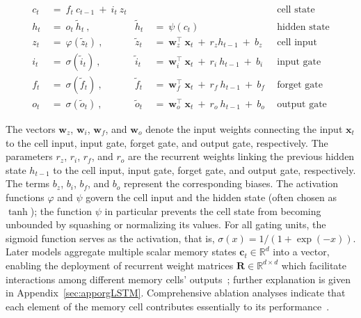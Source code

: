 \begin{align}
c_t \ &= \  f_t \ c_{t-1} \ + \ i_t \ z_t &  & &\text{cell state} \\
h_t  \ &= \ o_t \ \tilde{h}_t \ , & \tilde{h}_t \ &= \ \psi \left( c_t\right)
  &\text{hidden state} \\
z_t \ &= \ \varphi \left( \tilde{z}_t \right) \ , 
  &\tilde{z}_t \ &=  \ \mathbf{w}^\top_{z} \ \mathbf{x}_t \ + \
  r_{z}  h_{t-1} \ + \  b_{z} \ \
  &\text{cell input} \\
i_t \ &= \ \sigma \left( \tilde{i}_t  \right) \ , 
  &\tilde{i}_t \ &= \ \mathbf{w}^\top_{i} \ \mathbf{x}_t \ + \
  r_{i}  \ h_{t-1} \ + \  b_{i} \ \
  &\text{input gate} \\
f_t \ &= \ \sigma \left(  \tilde{f}_t \right) \ , 
  &\tilde{f}_t \ &= \ \mathbf{w}^\top_{f} \ \mathbf{x}_t  \ + \
  r_{f}  \ h_{t-1} \ + \  b_{f} \ \
  &\text{forget gate} \\
o_t \ &= \ \sigma \left( \tilde{o}_t \right) \ , 
  &\tilde{o}_t  \ &= \ \mathbf{w}^\top_{o} \ \mathbf{x}_t \ + \
  r_{o}  \ h_{t-1} \ + \  b_{o} \ \
  &\text{output gate} 
\end{align}

The vectors $\mathbf{w}_{z}$, $\mathbf{w}_{i}$,
$\mathbf{w}_{f}$, and $\mathbf{w}_{o}$ denote the input weights connecting the input $\mathbf{x}_t$ to the cell input, input gate, forget gate, and output gate, respectively. The parameters $r_{z}$, $r_{i}$, $r_{f}$, and $r_{o}$ are the recurrent weights linking the previous hidden state $h_{t-1}$ to the cell input, input gate, forget gate, and output gate, respectively. The terms $b_{z}$, $b_{i}$, $b_{f}$, and $b_{o}$ represent the corresponding biases. The activation functions $\varphi$ and $\psi$ govern the cell input and the hidden state (often chosen as $\tanh$); the function $\psi$ in particular prevents the cell state from becoming unbounded by squashing or normalizing its values. For all gating units, the sigmoid function serves as the activation, that is, $\sigma \left( x \right)= 1/(1+\exp(-x))$. Later models aggregate multiple scalar memory states $\mathbf{c}_t \in \mathbb{R}^{d}$ into a vector, enabling the deployment of recurrent weight matrices $\mathbf{R} \in \mathbb{R}^{d \times d}$ which facilitate interactions among different memory cells’ outputs~\citep{Greff:15}; further explanation is given in Appendix~\ref{sec:apporgLSTM}. Comprehensive ablation analyses indicate that each element of the memory cell contributes essentially to its performance~\citep{Greff:15}.

